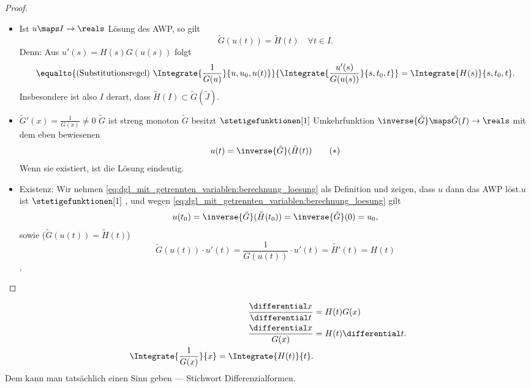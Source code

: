 \begin{proof}
  \begin{itemize}
    \item Ist \( u\maps I\to \reals \) Lösung des AWP, so gilt 
    \begin{equation*}
      \tilde{G}(u(t))=\tilde{H}(t) \quad \forall t\in I.
    \end{equation*}
    Denn: Aus \( u'(s)=H(s) G(u(s)) \) folgt
    \begin{equation*}
      \equalto{(\text{Substitutionsregel})\ \Integrate{\frac{1}{G(u)}}{u,u_0,u(t)}}{\Integrate{\frac{u'(s)}{G(u(s))}}{s,t_0,t}}=\Integrate{H(s)}{s,t_0,t}.
    \end{equation*}
    Insbesondere ist also \( I \) derart, dass \( \tilde{H}(I)\subset \tilde{G}(\tilde{J}) \).
    \item \( \tilde{G}'(x)=\frac{1}{G(x)}\neq 0 \) \timplies \( \tilde{G}  \) ist streng monoton \timplies \( \tilde{G} \) besitzt \( \stetigefunktionen[1] \) Umkehrfunktion \( \inverse{\tilde{G}}\maps \tilde{G}(I)\to \reals \) \timplies mit dem eben bewiesenen
    \begin{equation*}
      u(t)=\inverse{\tilde{G}}(\tilde{H}(t))\tag{\( * \)}\label{eq:dgl_mit_getrennten_variablen:berechnung_loesung}
    \end{equation*}
    \timplies Wenn sie existiert, ist die Lösung eindeutig.
    \item Existenz: Wir nehmen \eqref{eq:dgl_mit_getrennten_variablen:berechnung_loesung} als Definition und zeigen, dass \( u \) dann das AWP löst.\( u \) ist \( \stetigefunktionen[1]\) \checkmark, und wegen \eqref{eq:dgl_mit_getrennten_variablen:berechnung_loesung} gilt
    \begin{equation*}
      u(t_0)=\inverse{\tilde{G}}(\tilde{H}(t_0))=\inverse{\tilde{G}}(0)=u_0,
    \end{equation*}
    sowie (\( \tilde{G}(u(t))=\tilde{H}(t) \))
    \begin{equation*}
      \tilde{G}(u(t))\cdot u'(t)=\frac{1}{G(u(t))}\cdot u'(t)=\tilde{H'}(t)=H(t)
    \end{equation*}
    \timplies \Beh.
  \end{itemize}
\end{proof}
\begin{merkregel}
  \begin{align*}
    \frac{\differential x}{\differential t}&=H(t) G(x)\\
    \frac{\differential x}{G(x)}&=H(t)\differential t.\\
    \Integrate{\frac{1}{G(x)}}{x}=\Integrate{H(t)}{t}.
  \end{align*}
  Dem kann man tatsächlich einen Sinn geben --- Stichwort Differenzialformen.
\end{merkregel}
